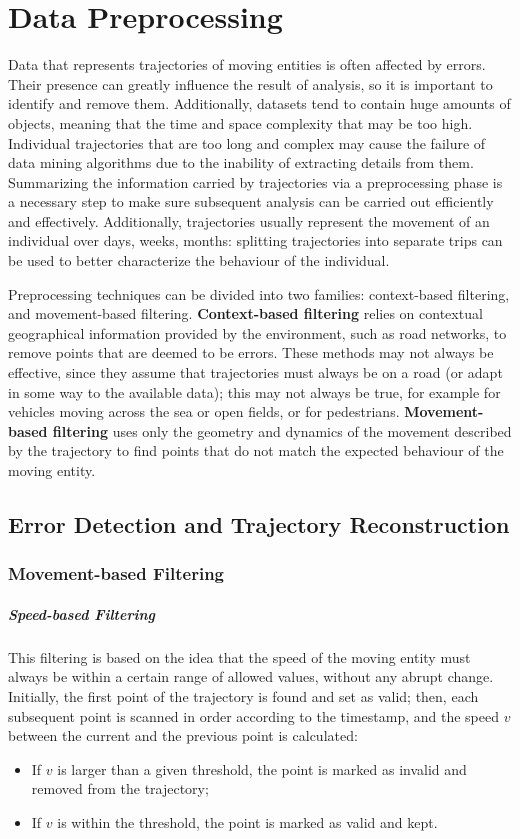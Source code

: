 \chapter{Data Preprocessing}

Data that represents trajectories of moving entities is often affected by errors. Their presence can greatly influence the result of analysis, so it is important to identify and remove them. Additionally, datasets tend to contain huge amounts of objects, meaning that the time and space complexity that may be too high. Individual trajectories that are too long and complex may cause the failure of data mining algorithms due to the inability of extracting details from them. Summarizing the information carried by trajectories via a preprocessing phase is a necessary step to make sure subsequent analysis can be carried out efficiently and effectively. Additionally, trajectories usually represent the movement of an individual over days, weeks, months: splitting trajectories into separate trips can be used to better characterize the behaviour of the individual.

Preprocessing techniques can be divided into two families: context-based filtering, and movement-based filtering. \textbf{Context-based filtering} relies on contextual geographical information provided by the environment, such as road networks, to remove points that are deemed to be errors. These methods may not always be effective, since they assume that trajectories must always be on a road (or adapt in some way to the available data); this may not always be true, for example for vehicles moving across the sea or open fields, or for pedestrians. \textbf{Movement-based filtering} uses only the geometry and dynamics of the movement described by the trajectory to find points that do not match the expected behaviour of the moving entity.

\section{Error Detection and Trajectory Reconstruction}
\subsection{Movement-based Filtering}

\paragraph{Speed-based Filtering}
This filtering is based on the idea that the speed of the moving entity must always be within a certain range of allowed values, without any abrupt change. Initially, the first point of the trajectory is found and set as valid; then, each subsequent point is scanned in order according to the timestamp, and the speed $v$ between the current and the previous point is calculated:
\begin{itemize}
    \item If $v$ is larger than a given threshold, the point is marked as invalid and removed from the trajectory;
    \item If $v$ is within the threshold, the point is marked as valid and kept.
\end{itemize}

